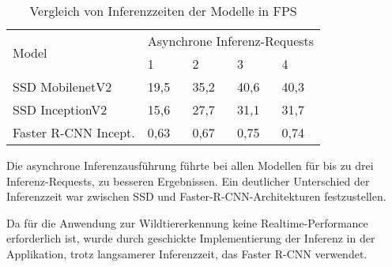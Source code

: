 \vspace{1cm}
\begin{table}[H]
  \centering
  \begin{tabular}{m{}|m{}<{\centering}|m{}<{\centering}|m{}<{\centering}|m{}<{\centering}}
  \hline
  \multirow{2}{*}{Model} & \multicolumn{4}{c}{Asynchrone Inferenz-Requests} \\ \cline{2-5} 
                         & 1           & 2          & 3          & 4          \\ \hline\hline
  SSD MobilenetV2        & 19,5           & 35,2          & 40,6          & 40,3          \\
  SSD InceptionV2        & 15,6           & 27,7          & 31,1          & 31,7          \\
  Faster R-CNN Incept.   & 0,63           & 0,67          & 0,75          & 0,74          \\ \hline
  \end{tabular}
  \caption{Vergleich von Inferenzzeiten der Modelle in FPS}
  \label{table:infertime}
\end{table}
\vspace{1cm}

Die asynchrone Inferenzausführung führte bei allen Modellen 
für bis zu drei Inferenz-Requests, zu besseren Ergebnissen.
Ein deutlicher Unterschied der Inferenzzeit war 
zwischen SSD und Faster-R-CNN-Architekturen festzustellen.

Da für die Anwendung zur Wildtiererkennung 
keine Realtime-Performance erforderlich ist,
wurde durch geschickte Implementierung der Inferenz in der 
Applikation, trotz langsamerer Inferenzzeit, das 
Faster R-CNN verwendet.
